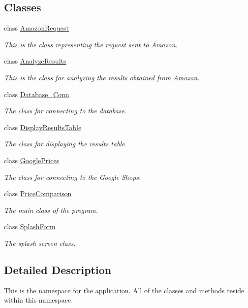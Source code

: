 \subsection*{Classes}
\begin{DoxyCompactItemize}
\item 
class \hyperlink{class_price___comparison_1_1_amazon_request}{Amazon\-Request}
\begin{DoxyCompactList}\small\item\em This is the class representing the request sent to Amazon. \end{DoxyCompactList}\item 
class \hyperlink{class_price___comparison_1_1_analyze_results}{Analyze\-Results}
\begin{DoxyCompactList}\small\item\em This is the class for analyzing the results obtained from Amazon. \end{DoxyCompactList}\item 
class \hyperlink{class_price___comparison_1_1_database___conn}{Database\-\_\-\-Conn}
\begin{DoxyCompactList}\small\item\em The class for connecting to the database. \end{DoxyCompactList}\item 
class \hyperlink{class_price___comparison_1_1_display_results_table}{Display\-Results\-Table}
\begin{DoxyCompactList}\small\item\em The class for displaying the results table. \end{DoxyCompactList}\item 
class \hyperlink{class_price___comparison_1_1_google_prices}{Google\-Prices}
\begin{DoxyCompactList}\small\item\em The class for connecting to the Google Shops. \end{DoxyCompactList}\item 
class \hyperlink{class_price___comparison_1_1_price_comparison}{Price\-Comparison}
\begin{DoxyCompactList}\small\item\em The main class of the program. \end{DoxyCompactList}\item 
class \hyperlink{class_price___comparison_1_1_splash_form}{Splash\-Form}
\begin{DoxyCompactList}\small\item\em The splash screen class. \end{DoxyCompactList}\end{DoxyCompactItemize}


\subsection{Detailed Description}
This is the namespace for the application. All of the classes and methods reside within this namespace. 